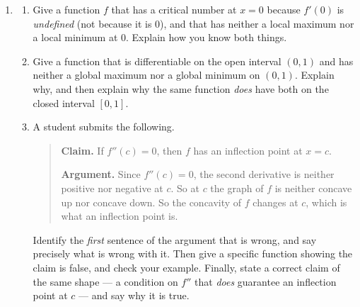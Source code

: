 \documentclass[11pt]{article}
\begin{document}
\begin{enumerate}[resume]
\item[]
\begin{enumerate}
\item Give a function $f$ that has a critical number at $x=0$ because $f'(0)$ is
\emph{undefined} (not because it is $0$), and that has neither a local maximum nor a local
minimum at $0$. Explain how you know both things.

\item Give a function that is differentiable on the open interval $(0,1)$ and has neither a
global maximum nor a global minimum on $(0,1)$. Explain why, and then explain why the same
function \emph{does} have both on the closed interval $[0,1]$.

\item A student submits the following.

\smallskip
\begin{quote}
\textbf{Claim.} If $f''(c)=0$, then $f$ has an inflection point at $x=c$.

\textbf{Argument.} Since $f''(c)=0$, the second derivative is neither positive nor
negative at $c$. So at $c$ the graph of $f$ is neither concave up nor concave down. So the
concavity of $f$ changes at $c$, which is what an inflection point is.
\end{quote}
\smallskip

Identify the \emph{first} sentence of the argument that is wrong, and say precisely what
is wrong with it. Then give a specific function showing the claim is false, and check
your example. Finally, state a correct claim of the same shape --- a condition on $f''$
that \emph{does} guarantee an inflection point at $c$ --- and say why it is true.
\end{enumerate}
\end{enumerate}
\end{document}
